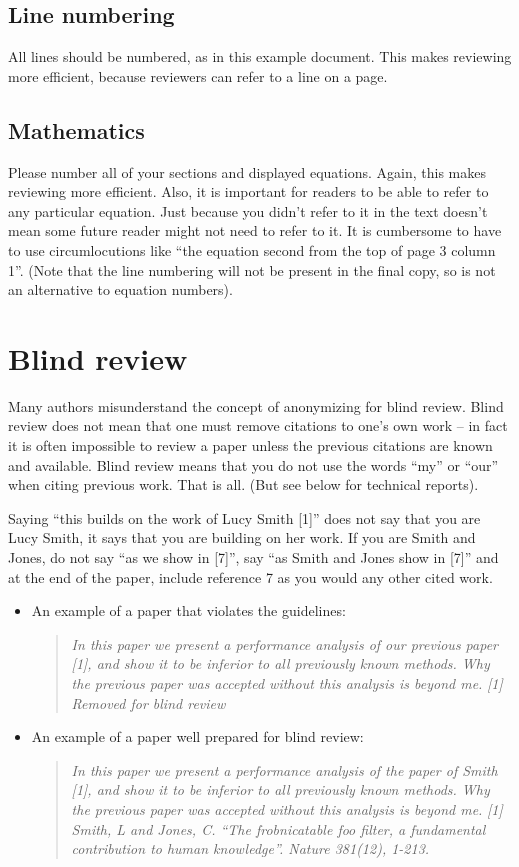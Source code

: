\documentclass[runningheads]{llncs}
\begin{document}
	\subsection{Line numbering}
	All lines should be numbered, as in this example document.
	This makes reviewing more efficient, because reviewers can refer to a line on a page.

	\subsection{Mathematics}
	Please number all of your sections and displayed equations.
	Again, this makes reviewing more efficient.
	Also, it is important for readers to be able to refer to any particular equation.
	Just because you didn't refer to it in the text doesn't mean some future reader might not need to refer to it.
	It is cumbersome to have to use circumlocutions like ``the equation second from the top of page 3 column 1''.
	(Note that the line numbering will not be present in the final copy, so is not an alternative to equation numbers).

	\section{Blind review}
	\label{sec:blind}
	Many authors misunderstand the concept of anonymizing for blind review.
	Blind review does not mean that one must remove citations to one's own work -- in fact it is often impossible to review a paper unless the previous citations are known and available.
	Blind review means that you do not use the words ``my'' or ``our'' when citing previous work.
	That is all.
	(But see below for technical reports).

	Saying ``this builds on the work of Lucy Smith [1]'' does not say that you are Lucy Smith, it says that you are building on her work.
	If you are Smith and Jones, do not say ``as we show in [7]'', say ``as Smith and Jones show in [7]'' and at the end of the paper, include reference 7 as you would any other cited work.

	\begin{itemize}
		\item An example of a paper that violates the guidelines:
		\begin{quote}
			\emph{
				In this paper we present a performance analysis of our previous paper [1], and show it to be inferior to all previously known methods.
				Why the previous paper was accepted without this analysis is beyond me.
			}
			\emph{[1] Removed for blind review}
		\end{quote}
		\item An example of a paper well prepared for blind review:
			\begin{quote}
				\emph{
					In this paper we present a performance analysis of the paper of Smith [1], and show it to be inferior to all previously known methods.
					Why the previous paper was accepted without this analysis is beyond me.
				}
				\emph{[1] Smith, L and Jones, C. ``The frobnicatable foo filter, a fundamental contribution to human knowledge''. Nature 381(12), 1-213.}
			\end{quote}
	\end{itemize}
\end{document}
